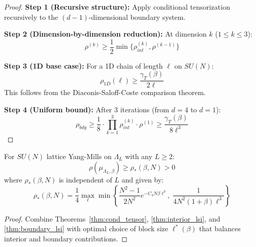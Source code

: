 \begin{proof}
\textbf{Step 1 (Recursive structure):}
Apply conditional tensorization recursively to the $(d-1)$-dimensional boundary system.

\textbf{Step 2 (Dimension-by-dimension reduction):}
At dimension $k$ ($1 \leq k \leq 3$):
\begin{equation}
\rho^{(k)} \geq \frac{1}{2} \min\{\rho_{int}^{(k)}, \rho^{(k-1)}\}
\end{equation}

\textbf{Step 3 (1D base case):}
For a 1D chain of length $\ell$ on $SU(N)$:
\begin{equation}
\rho_{1D}(\ell) \geq \frac{\gamma_T(\beta)}{2\ell}
\end{equation}
This follows from the Diaconis-Saloff-Coste comparison theorem.

\textbf{Step 4 (Uniform bound):}
After 3 iterations (from $d=4$ to $d=1$):
\begin{equation}
\rho_{bdy} \geq \frac{1}{8} \cdot \prod_{k=1}^{3} \rho_{int}^{(k)} \cdot \rho^{(1)} \geq \frac{\gamma_T(\beta)}{8\ell^3}
\end{equation}
\end{proof}

\begin{theorem}
\label{thm:uniform_lsi_main}
For $SU(N)$ lattice Yang-Mills on $\Lambda_L$ with any $L \geq 2$:
\begin{equation}
\rho(\mu_{\Lambda_L, \beta}) \geq \rho_*(\beta, N) > 0
\end{equation}
where $\rho_*(\beta, N)$ is independent of $L$ and given by:
\begin{equation}
\rho_*(\beta, N) = \frac{1}{4} \max_{\ell} \min\left\{\frac{N^2-1}{2N^2} e^{-C_4 N\beta \ell^3}, \; \frac{1}{4N^2(1+\beta)\ell^3}\right\}
\end{equation}
\end{theorem}

\begin{proof}
Combine Theorems~\ref{thm:cond_tensor}, \ref{thm:interior_lsi}, and \ref{thm:boundary_lsi} with optimal choice of block size $\ell^*(\beta)$ that balances interior and boundary contributions.
\end{proof}


